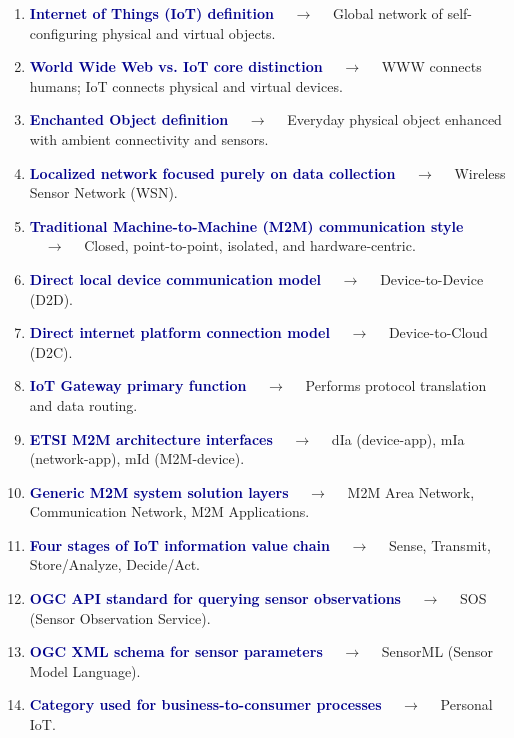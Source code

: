 \documentclass[11pt,a4paper]{article}
\begin{document}
\begin{enumerate}[label=\arabic*., leftmargin=*, labelsep=0.8em, itemsep=0.35em, parsep=0.1em, topsep=0.2em]
  \item \textcolor{darkblue}{\textbf{Internet of Things (IoT) definition}} $\quad\to\quad$ Global network of self-configuring physical and virtual objects.
  \item \textcolor{darkblue}{\textbf{World Wide Web vs. IoT core distinction}} $\quad\to\quad$ WWW connects humans; IoT connects physical and virtual devices.
  \item \textcolor{darkblue}{\textbf{Enchanted Object definition}} $\quad\to\quad$ Everyday physical object enhanced with ambient connectivity and sensors.
  \item \textcolor{darkblue}{\textbf{Localized network focused purely on data collection}} $\quad\to\quad$ Wireless Sensor Network (WSN).
  \item \textcolor{darkblue}{\textbf{Traditional Machine-to-Machine (M2M) communication style}} $\quad\to\quad$ Closed, point-to-point, isolated, and hardware-centric.
  \item \textcolor{darkblue}{\textbf{Direct local device communication model}} $\quad\to\quad$ Device-to-Device (D2D).
  \item \textcolor{darkblue}{\textbf{Direct internet platform connection model}} $\quad\to\quad$ Device-to-Cloud (D2C).
  \item \textcolor{darkblue}{\textbf{IoT Gateway primary function}} $\quad\to\quad$ Performs protocol translation and data routing.
  \item \textcolor{darkblue}{\textbf{ETSI M2M architecture interfaces}} $\quad\to\quad$ dIa (device-app), mIa (network-app), mId (M2M-device).
  \item \textcolor{darkblue}{\textbf{Generic M2M system solution layers}} $\quad\to\quad$ M2M Area Network, Communication Network, M2M Applications.
  \item \textcolor{darkblue}{\textbf{Four stages of IoT information value chain}} $\quad\to\quad$ Sense, Transmit, Store/Analyze, Decide/Act.
  \item \textcolor{darkblue}{\textbf{OGC API standard for querying sensor observations}} $\quad\to\quad$ SOS (Sensor Observation Service).
  \item \textcolor{darkblue}{\textbf{OGC XML schema for sensor parameters}} $\quad\to\quad$ SensorML (Sensor Model Language).
  \item \textcolor{darkblue}{\textbf{Category used for business-to-consumer processes}} $\quad\to\quad$ Personal IoT.

\end{enumerate}
\end{document}
